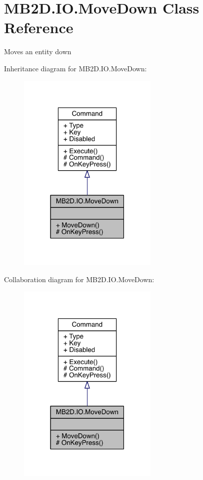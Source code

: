\hypertarget{class_m_b2_d_1_1_i_o_1_1_move_down}{}\section{M\+B2\+D.\+I\+O.\+Move\+Down Class Reference}
\label{class_m_b2_d_1_1_i_o_1_1_move_down}


Moves an entity down  




Inheritance diagram for M\+B2\+D.\+I\+O.\+Move\+Down\+:
\nopagebreak
\begin{figure}[H]
\begin{center}
\leavevmode
\includegraphics[width=190pt]{class_m_b2_d_1_1_i_o_1_1_move_down__inherit__graph}
\end{center}
\end{figure}


Collaboration diagram for M\+B2\+D.\+I\+O.\+Move\+Down\+:
\nopagebreak
\begin{figure}[H]
\begin{center}
\leavevmode
\includegraphics[width=190pt]{class_m_b2_d_1_1_i_o_1_1_move_down__coll__graph}
\end{center}
\end{figure}
